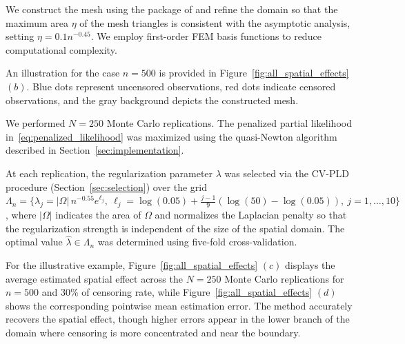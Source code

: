 \documentclass[11pt]{article}
\begin{document}
We construct the mesh using the package of \cite{sangalli2021spatial} and refine the domain so that the maximum area $\eta$ of the mesh triangles is consistent with the asymptotic analysis, setting $\eta = 0.1 n^{-0.45}$. We employ first-order FEM basis functions to reduce computational complexity.

An illustration for the case \( n = 500 \) is provided in Figure~\ref{fig:all_spatial_effects} $(b)$. %
Blue dots represent uncensored observations, red dots indicate censored observations, and the gray background depicts the constructed mesh.


We performed \(N = 250\) Monte Carlo replications. The penalized partial likelihood in~\eqref{eq:penalized_likelihood} was maximized using the quasi-Newton algorithm described in Section~\ref{sec:implementation}. 

At each replication, the regularization parameter \(\lambda\) was selected via the CV-PLD procedure (Section~\ref{sec:selection}) over the grid $\Lambda_n = \{\lambda_j = |\Omega|\,n^{-0.55}e^{\ell_j},\ \ell_j = \log(0.05) + \tfrac{j-1}{9}(\log(50) - \log(0.05)),\ j = 1,\dots,10\}$, where $|\Omega|$ indicates the area of $\Omega$ and normalizes the Laplacian penalty so that the regularization strength is independent of the size of the spatial domain. The optimal value \(\hat{\lambda} \in \Lambda_n\) was determined using five-fold cross-validation. 

For the illustrative example, Figure~\ref{fig:all_spatial_effects} $(c)$ %
displays the average estimated spatial effect across the \(N = 250\) Monte Carlo replications for $n = 500$ and 30\% of censoring rate, while Figure~\ref{fig:all_spatial_effects} $(d)$
shows the corresponding pointwise mean estimation error. The method accurately recovers the spatial effect, though higher errors appear in the lower branch of the domain where censoring is more concentrated and near the boundary.
\end{document}
